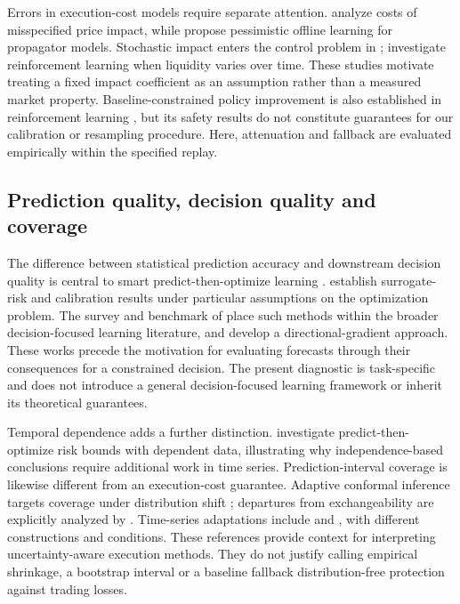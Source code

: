 Errors in execution-cost models require separate attention. \citet{hey2023} analyze costs of misspecified price impact, while \citet{neumanoffline2023} propose pessimistic offline learning for propagator models. Stochastic impact enters the control problem in \citet{fouque2022}; \citet{macri2024} investigate reinforcement learning when liquidity varies over time. These studies motivate treating a fixed impact coefficient as an assumption rather than a measured market property. Baseline-constrained policy improvement is also established in reinforcement learning \citep{laroche2019}, but its safety results do not constitute guarantees for our calibration or resampling procedure. Here, attenuation and fallback are evaluated empirically within the specified replay.

\subsection{Prediction quality, decision quality and coverage}

The difference between statistical prediction accuracy and downstream decision quality is central to smart predict-then-optimize learning \citep{elmachtoub2022}. \citet{liu2021} establish surrogate-risk and calibration results under particular assumptions on the optimization problem. The survey and benchmark of \citet{mandi2024} place such methods within the broader decision-focused learning literature, and \citet{gupta2024} develop a directional-gradient approach. These works precede the motivation for evaluating forecasts through their consequences for a constrained decision. The present diagnostic is task-specific and does not introduce a general decision-focused learning framework or inherit its theoretical guarantees.

Temporal dependence adds a further distinction. \citet{liudependent2024} investigate predict-then-optimize risk bounds with dependent data, illustrating why independence-based conclusions require additional work in time series. Prediction-interval coverage is likewise different from an execution-cost guarantee. Adaptive conformal inference targets coverage under distribution shift \citep{gibbs2021}; departures from exchangeability are explicitly analyzed by \citet{barber2023}. Time-series adaptations include \citet{zaffran2022} and \citet{xu2021}, with different constructions and conditions. These references provide context for interpreting uncertainty-aware execution methods. They do not justify calling empirical shrinkage, a bootstrap interval or a baseline fallback distribution-free protection against trading losses.

